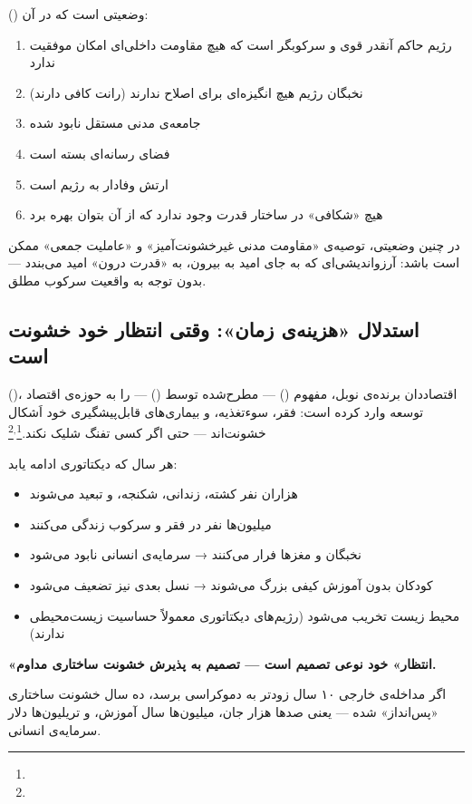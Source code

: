 \begin{tcolorbox}[defbox, title={مفهوم: انسداد تاریخی}]
 () وضعیتی است که در آن:
\begin{enumerate}
\item رژیم حاکم آنقدر قوی و سرکوبگر است که هیچ مقاومت داخلی‌ای امکان موفقیت ندارد
\item نخبگان رژیم هیچ انگیزه‌ای برای اصلاح ندارند (رانت کافی دارند)
\item جامعه‌ی مدنی مستقل نابود شده
\item فضای رسانه‌ای بسته است
\item ارتش وفادار به رژیم است
\item هیچ «شکافی» در ساختار قدرت وجود ندارد که از آن بتوان بهره برد
\end{enumerate}

در چنین وضعیتی، توصیه‌ی «مقاومت مدنی غیرخشونت‌آمیز» و «عاملیت جمعی» ممکن است  باشد: آرزواندیشی‌ای که به جای امید به بیرون، به «قدرت درون» امید می‌بندد — بدون توجه به واقعیت سرکوب مطلق.
\end{tcolorbox}

\subsection{استدلال «هزینه‌ی زمان»: وقتی انتظار خود خشونت است}
\label{subsec:ch15-cost-of-time}

 ()، اقتصاددان برنده‌ی نوبل، مفهوم  () — مطرح‌شده توسط  () — را به حوزه‌ی اقتصاد توسعه وارد کرده است: فقر، سوءتغذیه، و بیماری‌های قابل‌پیشگیری خود اَشکال خشونت‌اند — حتی اگر کسی تفنگ شلیک نکند.\footnote{}$^{,}$\footnote{}

\begin{tcolorbox}[wavebox, title={استدلال هزینه‌ی زمان}]
هر سال که دیکتاتوری ادامه یابد:
\begin{itemize}
\item هزاران نفر کشته، زندانی، شکنجه، و تبعید می‌شوند
\item میلیون‌ها نفر در فقر و سرکوب زندگی می‌کنند
\item نخبگان و مغزها فرار می‌کنند → سرمایه‌ی انسانی نابود می‌شود
\item کودکان بدون آموزش کیفی بزرگ می‌شوند → نسل بعدی نیز تضعیف می‌شود
\item محیط زیست تخریب می‌شود (رژیم‌های دیکتاتوری معمولاً حساسیت زیست‌محیطی ندارند)
\end{itemize}

\textbf{«انتظار» خود نوعی تصمیم است — تصمیم به پذیرش خشونت ساختاری مداوم.}

اگر مداخله‌ی خارجی ۱۰ سال زودتر به دموکراسی برسد، ده سال خشونت ساختاری «پس‌انداز» شده — یعنی صدها هزار جان، میلیون‌ها سال آموزش، و تریلیون‌ها دلار سرمایه‌ی انسانی.
\end{tcolorbox}


